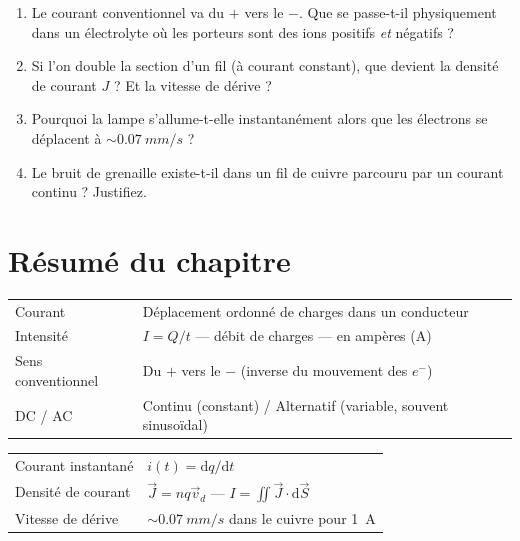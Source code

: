 \documentclass[12pt,a4paper,twoside]{book}
\begin{document}
\begin{enumerate}[nosep]
\item Le courant conventionnel va du $+$ vers le $-$. Que se passe-t-il physiquement dans un électrolyte où les porteurs sont des ions positifs \textit{et} négatifs ?
\item Si l'on double la section d'un fil (à courant constant), que devient la densité de courant $J$ ? Et la vitesse de dérive ?
\item Pourquoi la lampe s'allume-t-elle instantanément alors que les électrons se déplacent à $\sim\SI{0.07}{mm/s}$ ?
\item Le bruit de grenaille existe-t-il dans un fil de cuivre parcouru par un courant continu ? Justifiez.
\end{enumerate}

\section*{Résumé du chapitre}

\begin{bases}[title={\color{white} Résumé --- Les Bases}]
\begin{center}
\renewcommand{\arraystretch}{1.3}
\begin{tabular}{p{4cm}p{9cm}}
\toprule
Courant & Déplacement ordonné de charges dans un conducteur \\
Intensité & $I = Q/t$ --- débit de charges --- en ampères (A) \\
Sens conventionnel & Du $+$ vers le $-$ (inverse du mouvement des $e^-$) \\
DC / AC & Continu (constant) / Alternatif (variable, souvent sinusoïdal) \\
\bottomrule
\end{tabular}
\end{center}
\end{bases}

\begin{approfondissement}[title={\color{white} Résumé --- Approfondissement}]
\begin{center}
\renewcommand{\arraystretch}{1.3}
\begin{tabular}{p{4cm}p{9cm}}
\toprule
Courant instantané & $i(t) = \mathrm{d}q/\mathrm{d}t$ \\
Densité de courant & $\vec{J} = nq\vec{v}_d$ --- $I = \iint \vec{J}\cdot\mathrm{d}\vec{S}$ \\
Vitesse de dérive & $\sim\SI{0.07}{mm/s}$ dans le cuivre pour \SI{1}{A} \\
\bottomrule
\end{tabular}
\end{center}
\end{approfondissement}
\end{document}
